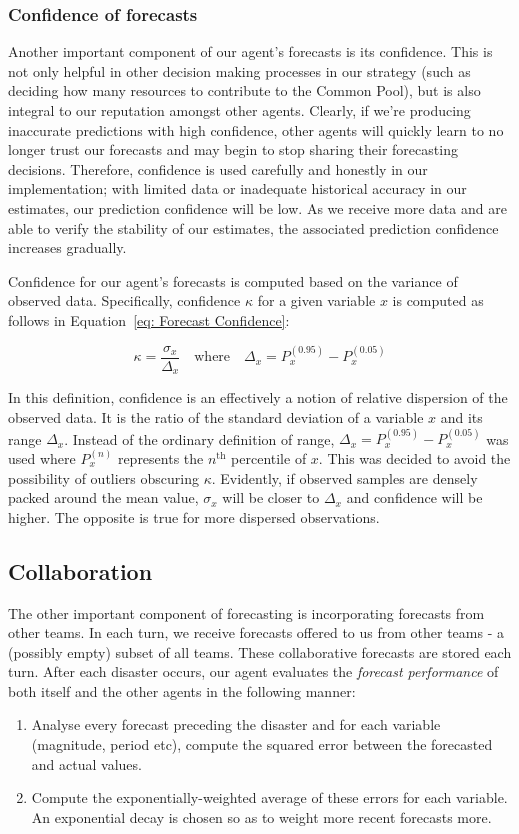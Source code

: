 \subsubsection{Confidence of forecasts}
Another important component of our agent's forecasts is its confidence. This is not only helpful in other decision making processes in our strategy (such as deciding how many resources to contribute to the Common Pool), but is also integral to our reputation amongst other agents. Clearly, if we're producing  inaccurate predictions with high confidence, other agents will quickly learn to no longer trust our forecasts and may begin to stop sharing their forecasting decisions. Therefore, confidence is used carefully and honestly in our implementation; with limited data or inadequate historical accuracy in our estimates, our prediction confidence will be low. As we receive more data and are able to verify the stability of our estimates, the associated prediction confidence increases gradually. 

Confidence for our agent's forecasts is computed based on the variance of observed data. Specifically, confidence $\kappa$ for a given variable $x$ is computed as follows in Equation~\ref{eq: Forecast Confidence}:

\begin{equation}
\kappa = \frac{\sigma_x}{\Delta_x} \quad \text{where} \quad \Delta_x = P_x^{(0.95)}-P_x^{(0.05)}
\label{eq: Forecast Confidence}
\end{equation}

In this definition, confidence is an effectively a notion of relative dispersion of the observed data. It is the ratio of the standard deviation of a variable $x$ and its range $\Delta_x$. Instead of the ordinary definition of range, $\Delta_x = P_x^{(0.95)}-P_x^{(0.05)}$ was used where $ P_x^{(n)}$ represents the $n^{\text{th}}$ percentile of $x$. This was decided to avoid the possibility of outliers obscuring $\kappa$. Evidently, if observed samples are densely packed around the mean value, $\sigma_x$ will be closer to $\Delta_x$ and confidence will be higher. The opposite is true for more dispersed observations.

\subsection{Collaboration}
The other important component of forecasting is incorporating forecasts from other teams. In each turn, we receive forecasts offered to us from other teams - a (possibly empty) subset of all teams. These collaborative forecasts are stored each turn. After each disaster occurs, our agent evaluates the \textit{forecast performance} of both itself and the other agents in the following manner:
\begin{enumerate}
    \item Analyse every forecast preceding the disaster and for each variable (magnitude, period etc), compute the squared error between the forecasted and actual values. 
    \item Compute the exponentially-weighted average of these errors for each variable. An exponential decay is chosen so as to weight more recent forecasts more. 
\end{enumerate}

